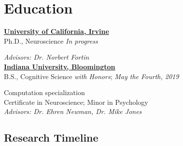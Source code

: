 \documentclass[10pt]{cooperCV2}
\begin{document}

\section{Education} 

  

\href{http://www.iu.edu/}{\textbf{University of California, Irvine}} \\
 Ph.D., Neuroscience \hfill \textit{In progress}



 \textit{Advisors: Dr. Norbert Fortin}\\ 

  

\href{http://www.iu.edu/}{\textbf{Indiana University, Bloomington}} \\
 B.S., Cognitive Science \textit{with Honors}; \hfill \textit{May the Fourth, 2019}

 Computation specialization \\ 
 Certificate in Neuroscience; Minor in Psychology\\  
 \textit{Advisors: Dr. Ehren Newman, Dr. Mike Jones}\\ 








%	






\subsection{Research Timeline}
\needspace{4em}
\myRule{\columnwidth}{1pt}
\end{document}
